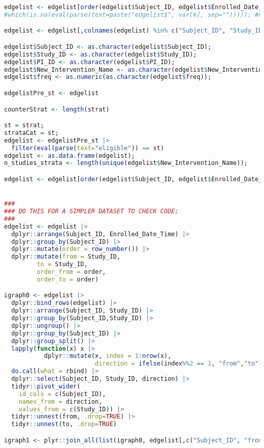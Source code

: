 \documentclass{article}
\begin{document}
\begin{lstlisting}[language=R]
edgelist <- edgelist[order(edgelist$Subject_ID, edgelist$Enrolled_Date_Time, edgelist$New_Intervention_Name),];
#which(is.na(eval(parse(text=paste("edgelist$", var[k], sep=""))))); #none, good check;

edgelist <- edgelist[,colnames(edgelist) %in% c("Subject_ID", "Study_ID", "New_Intervention_Name", "PI_ID", "Num_Patients", "freq", "eligible", "Randomized", "Combination", "Department", "Enrolled_Date_Time", "Status_Change_Date_Time", "New_Int_Name", "AE_Grade_3_Plus", "Age_65")];

edgelist$Subject_ID <- as.character(edgelist$Subject_ID);
edgelist$Study_ID <- as.character(edgelist$Study_ID);
edgelist$PI_ID <- as.character(edgelist$PI_ID);
edgelist$New_Intervention_Name <- as.character(edgelist$New_Intervention_Name);
edgelist$freq <- as.numeric(as.character(edgelist$freq));

edgelistPre_st <- edgelist

counterStrat <- length(strat)

st = strat;
strataCat = st;
edgelist <- edgelistPre_st |>
  filter(eval(parse(text="eligible")) == st)
edgelist <- as.data.frame(edgelist);
n_studies_strata <- length(unique(edgelist$New_Intervention_Name));

edgelist <- edgelist[order(edgelist$Subject_ID, edgelist$Enrolled_Date_Time, edgelist$New_Intervention_Name),];


###
### DO THIS FOR A SIMPLER DATASET TO CHECK CODE;
###
edgelist <- edgelist |>
  dplyr::arrange(Subject_ID, Enrolled_Date_Time) |>
  dplyr::group_by(Subject_ID) |>
  dplyr::mutate(order = row_number()) |>
  dplyr::mutate(from = Study_ID, 
         to = Study_ID,
         order_from = order, 
         order_to = order)

igraph0 <- edgelist |>
  dplyr::bind_rows(edgelist) |>
  dplyr::arrange(Subject_ID, Study_ID) |>
  dplyr::group_by(Subject_ID,Study_ID) |>
  dplyr::ungroup() |>
  dplyr::group_by(Subject_ID) |>
  dplyr::group_split() |>
  lapply(function(x) x |>
           dplyr::mutate(x, index = 1:nrow(x),
                         direction = ifelse(index%%2 == 1, "from","to"))) |>
  do.call(what = rbind) |>
  dplyr::select(Subject_ID, Study_ID, direction) |>
  tidyr::pivot_wider(
    id_cols = c(Subject_ID),
    names_from = direction,
    values_from = c(Study_ID)) |>
  tidyr::unnest(from, .drop=TRUE) |>
  tidyr::unnest(to, .drop=TRUE) 

igraph1 <- plyr::join_all(list(igraph0, edgelist[,c("Subject_ID", "from", "order_from")]), by=c("Subject_ID", "from"), type='left');


\end{lstlisting}
\end{document}
